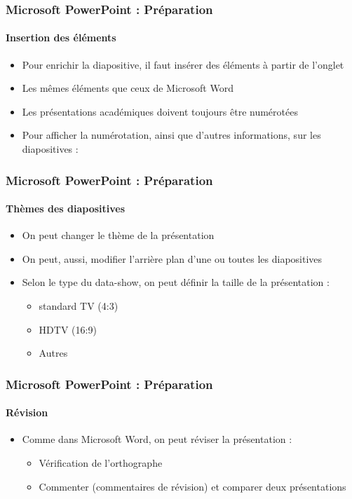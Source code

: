 \documentclass[xcolor=table, usenames,dvipsnames]{beamer}
\begin{document}
\begin{frame}
\frametitle{Microsoft PowerPoint : Préparation}
\framesubtitle{Insertion des éléments}


\begin{itemize}
	\item Pour enrichir la diapositive, il faut insérer des éléments à partir de l'onglet 
	\item Les mêmes éléments que ceux de Microsoft Word
	\item Les présentations académiques doivent toujours être numérotées
	\item Pour afficher la numérotation, ainsi que d'autres informations, sur les diapositives : 
\end{itemize}
\end{frame}

\begin{frame}
\frametitle{Microsoft PowerPoint : Préparation}
\framesubtitle{Thèmes des diapositives}


\begin{minipage}{0.60\textwidth}
	\begin{itemize}
		\item On peut changer le thème de la présentation 
		\item On peut, aussi, modifier l'arrière plan d'une ou toutes les diapositives
		\item Selon le type du data-show, on peut définir la taille de la présentation : 
		\begin{itemize}
			\item standard TV (4:3)
			\item HDTV (16:9)
			\item Autres
		\end{itemize}
	\end{itemize}
\end{minipage}
%
\begin{minipage}{0.39\textwidth}
\end{minipage}

\end{frame}

\begin{frame}
\frametitle{Microsoft PowerPoint : Préparation}
\framesubtitle{Révision}


\begin{itemize}
	\item Comme dans Microsoft Word, on peut réviser la présentation : 
	\begin{itemize}
		\item Vérification de l'orthographe  
		\item Commenter (commentaires de révision) et comparer deux présentations
	\end{itemize}
\end{itemize}

\end{frame}
\end{document}
